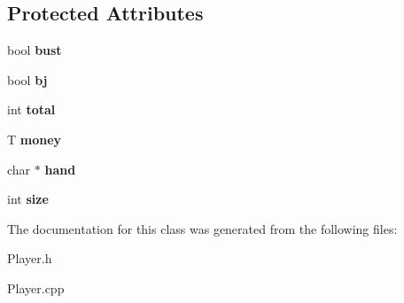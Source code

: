 \subsection*{Protected Attributes}
\begin{DoxyCompactItemize}
\item 
\mbox{\label{class_player_ab9bdbf4e4df2aa84a908c770a9712721}} 
bool {\bfseries bust}
\item 
\mbox{\label{class_player_a1ec278be12962bf7d79b95ba813b9a4a}} 
bool {\bfseries bj}
\item 
\mbox{\label{class_player_af20c83ae46c2128a207deccfef3634ee}} 
int {\bfseries total}
\item 
\mbox{\label{class_player_aa3f2c19f9c5f22c95d0aeaed8a4d3f7c}} 
T {\bfseries money}
\item 
\mbox{\label{class_player_aa3254d052976bd98168b10a922f89d79}} 
char $\ast$ {\bfseries hand}
\item 
\mbox{\label{class_player_a7d6242e043b6379298c5fca6c5fded95}} 
int {\bfseries size}
\end{DoxyCompactItemize}


The documentation for this class was generated from the following files\+:\begin{DoxyCompactItemize}
\item 
Player.\+h\item 
Player.\+cpp\end{DoxyCompactItemize}
